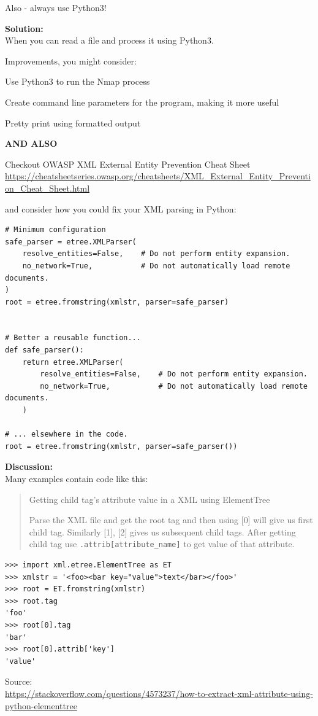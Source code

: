 \documentclass[a4paper,11pt,notitlepage]{report}
\begin{document}
Also - always use Python3!

{\bf Solution:}\\
When you can read a file and process it using Python3.

Improvements, you might consider:
\begin{list2}
\item Use Python3 to run the Nmap process
\item Create command line parameters for the program, making it more useful
\item Pretty print using formatted output
\end{list2}

\textbf{AND ALSO}

Checkout OWASP XML External Entity Prevention Cheat Sheet\\
\url{https://cheatsheetseries.owasp.org/cheatsheets/XML_External_Entity_Prevention_Cheat_Sheet.html}

and consider how you could fix your XML parsing in Python:
\begin{verbatim}
# Minimum configuration
safe_parser = etree.XMLParser(
    resolve_entities=False,    # Do not perform entity expansion.
    no_network=True,           # Do not automatically load remote documents.
)
root = etree.fromstring(xmlstr, parser=safe_parser)


# Better a reusable function...
def safe_parser():
    return etree.XMLParser(
        resolve_entities=False,    # Do not perform entity expansion.
        no_network=True,           # Do not automatically load remote documents.
    )

# ... elsewhere in the code.
root = etree.fromstring(xmlstr, parser=safe_parser())
\end{verbatim}




{\bf Discussion:}\\
Many examples contain code like this:

\begin{quote}
Getting child tag's attribute value in a XML using ElementTree

Parse the XML file and get the root tag and then using [0] will give us first child tag. Similarly [1], [2] gives us subsequent child tags. After getting child tag use \verb+.attrib[attribute_name]+ to get value of that attribute.
\end{quote}
\begin{verbatim}
>>> import xml.etree.ElementTree as ET
>>> xmlstr = '<foo><bar key="value">text</bar></foo>'
>>> root = ET.fromstring(xmlstr)
>>> root.tag
'foo'
>>> root[0].tag
'bar'
>>> root[0].attrib['key']
'value'
\end{verbatim}
Source:\\{\footnotesize \url{https://stackoverflow.com/questions/4573237/how-to-extract-xml-attribute-using-python-elementtree}}
\end{document}

